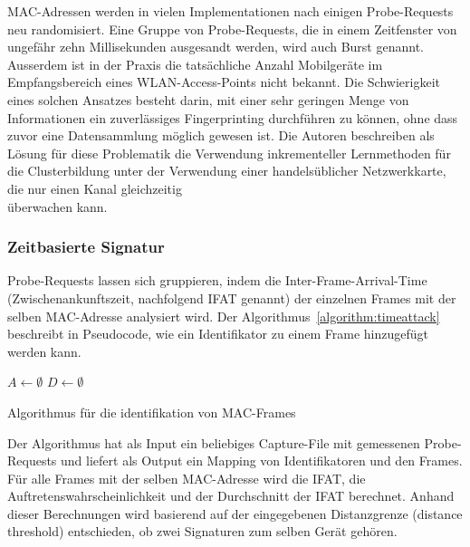 MAC-Adressen werden in vielen Implementationen nach einigen Probe-Requests 
neu randomisiert. 
Eine Gruppe von Probe-Requests, die in einem Zeitfenster von ungefähr zehn
Millisekunden ausgesandt werden, wird auch Burst genannt.
Ausserdem ist in der Praxis die tatsächliche Anzahl Mobilgeräte im Empfangsbereich
eines WLAN-Access-Points nicht bekannt.
Die Schwierigkeit eines solchen Ansatzes besteht darin, mit einer sehr geringen Menge 
von Informationen ein zuverlässiges Fingerprinting durchführen zu können, 
ohne dass zuvor eine Datensammlung möglich gewesen ist. 
Die Autoren beschreiben als Lösung für diese Problematik die Verwendung 
inkrementeller Lernmethoden für die Clusterbildung unter der Verwendung
einer handelsüblicher Netzwerkkarte, die nur einen Kanal gleichzeitig \\
überwachen kann.

\subsubsection*{Zeitbasierte Signatur}
Probe-Requests lassen sich gruppieren, indem die Inter-Frame-Arrival-Time
(Zwischenankunftszeit, nachfolgend IFAT genannt) der einzelnen Frames mit 
der selben MAC-Adresse analysiert wird.
Der Algorithmus~\ref{algorithm:timeattack} beschreibt in Pseudocode, 
wie ein Identifikator zu einem Frame hinzugefügt werden kann.

\clearpage

\begin{algorithm}
    \BlankLine
    $A \longleftarrow \emptyset $\;
    $D \longleftarrow \emptyset $
    \caption{Algorithmus für die identifikation von MAC-Frames
    \label{algorithm:timeattack}}
\end{algorithm}

Der Algorithmus hat als Input ein beliebiges Capture-File mit gemessenen
Probe-Requests und liefert als Output ein Mapping von Identifikatoren und
den Frames. 
Für alle Frames mit der selben MAC-Adresse wird die IFAT, 
die Auftretenswahrscheinlichkeit und der Durchschnitt der IFAT berechnet.
Anhand dieser Berechnungen wird basierend auf der eingegebenen Distanzgrenze
(distance threshold) entschieden, ob zwei Signaturen zum selben Gerät gehören.

